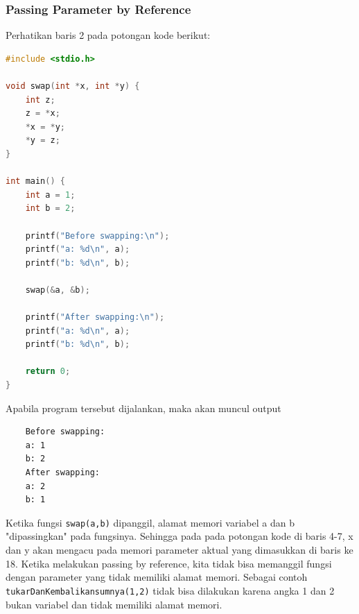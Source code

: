 \subsubsection{Passing Parameter by Reference}
Perhatikan baris 2 pada potongan kode berikut:
\begin{lstlisting}[language=c,caption = Passing by Reference,label=lst:passbyreference01]
#include <stdio.h>

void swap(int *x, int *y) {
    int z;
    z = *x;
    *x = *y;
    *y = z;
}

int main() {
    int a = 1;
    int b = 2;
    
    printf("Before swapping:\n");
    printf("a: %d\n", a);
    printf("b: %d\n", b);
    
    swap(&a, &b);
    
    printf("After swapping:\n");
    printf("a: %d\n", a);
    printf("b: %d\n", b);
    
    return 0;
}
\end{lstlisting}
Apabila program tersebut dijalankan, maka akan muncul output
\begin{verbatim}
    Before swapping:
    a: 1
    b: 2
    After swapping:
    a: 2
    b: 1
\end{verbatim}

Ketika fungsi \verb|swap(a,b)| dipanggil, alamat memori variabel a dan b "dipassingkan" pada fungsinya. Sehingga pada pada potongan kode di baris 4-7, x dan y akan mengacu pada memori parameter aktual yang dimasukkan di baris ke 18. Ketika melakukan passing by reference, kita tidak bisa memanggil fungsi dengan parameter yang tidak memiliki alamat memori. Sebagai contoh \verb|tukarDanKembalikansumnya(1,2)| tidak bisa dilakukan karena angka 1 dan 2 bukan variabel dan tidak memiliki alamat memori.

